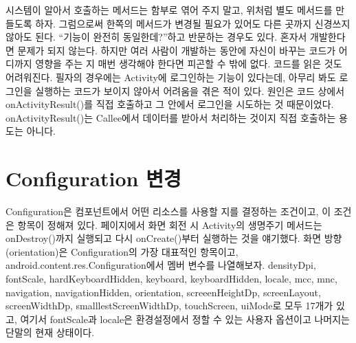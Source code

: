 시스템이 알아서 호출하는 메서드는 함부로 엮어 주지 말고, 위처럼 별도 메서드를 만들도록 하자. 그럼으로써 한쪽의 메서드가 변경될 필요가 있어도 다른 곳까지 신경쓰지 않아도 된다.
``기능이 완전히 동일한데?''하고 반문하는 경우도 있다. 혼자서 개발한다면 문제가 되지 않는다. 하지만 여러 사람이 개발하는 동안에 자신이 바꾸는 코드가 어디까지 영향을 주는 지 매번 생각해야 한다면 피곤할 수 밖에 없다. 
코드를 읽은 것도 어려워진다. 
필자의 경우에는 Activity에 로그인하는 기능이 있다는데, 아무리 봐도 로그인을 실행하는 코드가 보이지 않아서 어려움을 겪은 적이 있다. 
원인은 코드 상에서 onActivityResult()를 직접 호출하고 그 안에서 로그인을 시도하는 것 때문이었다. onActivityResult()는 Callee에서 데이터를 받아서 처리하는 것이지 직접 호출하는 용도는 아니다.

\section{Configuration 변경}
Configuration은 컴포넌트에서 어떤 리소스를 사용할 지를 결정하는 조건이고, 이 조건은 항목이 정해져 있다. 
\pageref{flow}페이지에서 화면 회전 시 Activity의 생명주기 메서드는 onDestroy()까지 실행되고 다시 onCreate()부터 실행하는 것을 얘기했다. 
화면 방향(orientation)은 Configuration의 가장 대표적인 항목이고, 
android.content.res.Configuration에서 멤버 변수를 나열해보자. 
densityDpi,
fontScale,
hardKeyboardHidden,
keyboard,
keyboardHidden,
locale,
mcc,
mnc, 
navigation, 
navigationHidden,
orientation,
screeenHeightDp,
screenLayout, 
screenWidthDp,
smalllestScreenWidthDp,
touchScreen,
uiMode로 모두 17개가 있고, 
여기서 fontScale과 locale은 환경설정에서 정할 수 있는 사용자 옵션이고 나머지는 단말의 현재 상태이다.\\

